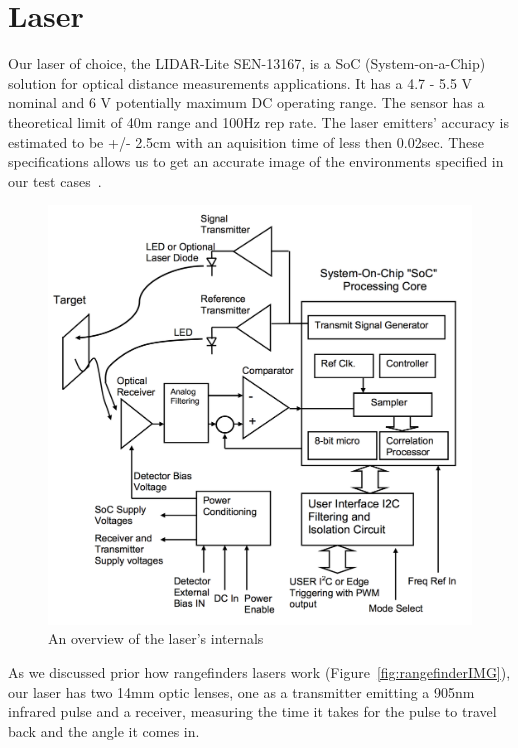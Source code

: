 \clearpage
\section{Laser} %

Our laser of choice, the LIDAR-Lite SEN-13167, is a SoC (System-on-a-Chip) solution for optical distance measurements applications. It has a 4.7 - 5.5 V nominal and 6 V potentially maximum DC operating range. The sensor has a theoretical limit of 40m range and 100Hz rep rate. The laser emitters' accuracy is estimated to be +/- 2.5cm with an aquisition time of less then 0.02sec. These specifications allows us to get an accurate image of the environments specified in our test cases~\cite{lidarsum}.

\begin{figure}[H]
	\centering
	\includegraphics[scale=.4]{images/internallidar.png}
	\caption{An overview of the laser's internals}
	\label{fig:internallidar}
\end{figure}

As we discussed prior how rangefinders lasers work (Figure~\ref{fig:rangefinderIMG}), our laser has two 14mm optic lenses, one as a transmitter emitting a 905nm infrared pulse and a receiver, measuring the time it takes for the pulse to travel back and the angle it comes in.

